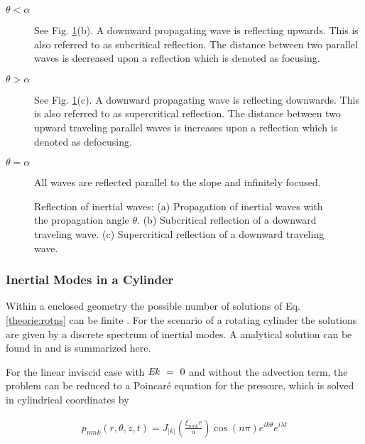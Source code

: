 \begin{description}
    \item[$\theta < \alpha$] See Fig. \ref{theorie:reflection_img}(b). A downward propagating wave is reflecting upwards.
                             This is also referred to as subcritical reflection.
                             The distance between two parallel waves is decreased upon a reflection which is denoted as focusing.
    \item[$\theta > \alpha$] See Fig. \ref{theorie:reflection_img}(c). A downward propagating wave is reflecting downwards.
                             This is also referred to as supercritical reflection.
                             The distance between two upward traveling parallel waves is increases upon a reflection which is denoted as defocusing.
    \item[$\theta = \alpha$] All waves are reflected parallel to the slope and infinitely focused.
\end{description}

\begin{figure}[!bp]
      \centering
          \centering
       \caption{Reflection of inertial waves:
        (a) Propagation of inertial waves with the propagation angle $\theta$.
        (b) Subcritical reflection of a downward traveling wave.
        (c) Supercritical reflection of a downward traveling wave.
       }
       \label{theorie:reflection_img}
\end{figure}

\clearpage


\subsubsection{Inertial Modes in a Cylinder}
\label{theorie:rotating:cyl_modes}

Within  a enclosed geometry the possible number of solutions of Eq. \ref{theorie:rotns} can be finite \citep{Clausen2011}.
For the scenario of a rotating cylinder the solutions are given by a discrete spectrum of  inertial modes.
A analytical solution can be found in \citep{Greenspan1990} and is summarized here.

For the linear inviscid case with $\mbox{\textit{Ek}}~=~0$ and without the advection term, the problem can be reduced to a Poincar\'{e} equation for the pressure,
which is solved in cylindrical coordinates by

\begin{align}
    p_{nmk}(r, \theta, z, t) = J_{|k|}\left(\frac{\xi_{nmk}r}{a} \right)\cos(n\pi)e^{ik\theta}e^{i\lambda t}
\end{align}

